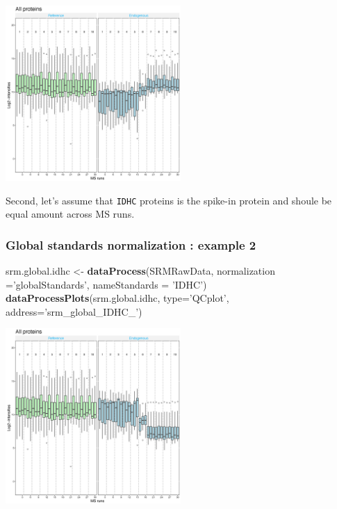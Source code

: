 \documentclass[]{book}
\newenvironment{Shaded}{\begin{snugshade}}{\end{snugshade}}
\newcommand{\DataTypeTok}[1]{\textcolor[rgb]{0.13,0.29,0.53}{#1}}
\newcommand{\KeywordTok}[1]{\textcolor[rgb]{0.13,0.29,0.53}{\textbf{#1}}}
\newcommand{\NormalTok}[1]{#1}
\newcommand{\StringTok}[1]{\textcolor[rgb]{0.31,0.60,0.02}{#1}}
\begin{document}
\includegraphics[width=0.5\textwidth,height=\textheight]{img/srm_global_PMG2_QCPlot.png}

Second, let's assume that \texttt{IDHC} proteins is the spike-in protein and shoule be equal amount across MS runs.

\hypertarget{global-standards-normalization-example-2}{%
\subsubsection{Global standards normalization : example 2}\label{global-standards-normalization-example-2}}

\begin{Shaded}
\begin{Highlighting}[]
\NormalTok{srm.global.idhc <-}\StringTok{ }\KeywordTok{dataProcess}\NormalTok{(SRMRawData, }\DataTypeTok{normalization =}\StringTok{'globalStandards'}\NormalTok{,}
                               \DataTypeTok{nameStandards =} \StringTok{'IDHC'}\NormalTok{)}
\KeywordTok{dataProcessPlots}\NormalTok{(srm.global.idhc, }\DataTypeTok{type=}\StringTok{'QCplot'}\NormalTok{, }\DataTypeTok{address=}\StringTok{'srm_global_IDHC_'}\NormalTok{)}
\end{Highlighting}
\end{Shaded}

\includegraphics[width=0.5\textwidth,height=\textheight]{img/srm_global_IDHC_QCPlot.png}
\end{document}
